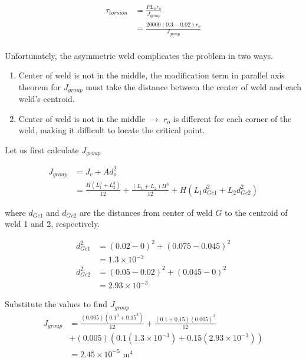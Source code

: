 \documentclass[a4paper,openany,12pt]{book}
\begin{document}
{{$$\begin{aligned}
    \tau_{torsion} &= \frac{P L_o r_o}{J_{group}} \\
                   &= \frac{20000(0.3 - 0.02)r_o}{J_{group}} \\
  \end{aligned}$$

Unfortunately, the asymmetric weld complicates the problem in two ways.

\begin{enumerate}
\item Center of weld is not in the middle, the modification term in
parallel axis theorem for \(J_{group}\) must take the distance between
the center of weld and each weld's centroid.

\item Center of weld is not in the middle \(\rightarrow\) \(r_o\) is different
for each corner of the weld, making it difficult to locate the
critical point.
\end{enumerate}

Let us first calculate \(J_{group}\)

$$\begin{aligned}
    J_{group} &= J_c + A d_o^2 \\
              &= \frac{H(L_1^3 + L_2^3)}{12} +\frac{(L_1 + L_2)H^3}{12} + H(L_1d_{Gc1}^2 + L_2d_{Gc2}^2)
  \end{aligned}$$

where \(d_{Gc1}\) and \(d_{Gc2}\) are the distances from center of weld \(G\)
to the centroid of weld 1 and 2, respectively.

$$\begin{aligned}
    d_{Gc1}^2 &= (0.02-0)^2+(0.075-0.045)^2 \\
              &= 1.3 \times 10^{-3} \\
    d_{Gc2}^2 &= (0.05-0.02)^2 + (0.045 - 0)^2 \\
              &= 2.93 \times 10^{-3}
  \end{aligned}$$

Substitute the values to find \(J_{group}\) $$\begin{aligned}
    J_{group} &= \frac{(0.005)(0.1^3 + 0.15^3)}{12} +\frac{(0.1 + 0.15)(0.005)^3}{12} \\
              &+ (0.005)(0.1(1.3 \times 10^{-3}) + 0.15(2.93 \times 10^{-3})) \\
              &= 2.45 \times 10^{-5} \text{ m}^4
  \end{aligned}$$

}}
\end{document}
